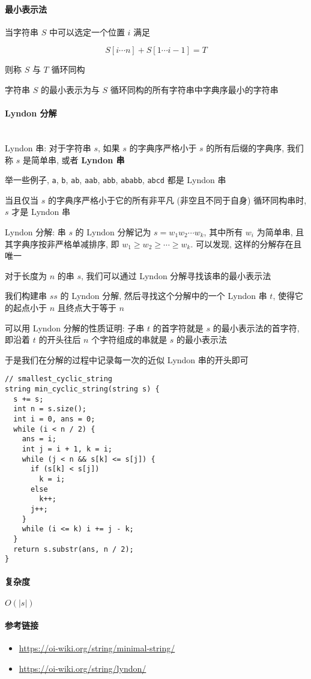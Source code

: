 \paragraph{最小表示法}

当字符串 \(S\) 中可以选定一个位置 \(i\) 满足

\[
    S[i\cdots n]+S[1\cdots i-1]=T
\]

则称 \(S\) 与 \(T\) 循环同构

字符串 \(S\) 的最小表示为与 \(S\) 循环同构的所有字符串中字典序最小的字符串

\paragraph{Lyndon 分解}~\\

Lyndon 串: 对于字符串 \(s\), 如果 \(s\) 的字典序严格小于 \(s\) 的所有后缀的字典序, 我们称 \(s\) 是简单串, 或者 \textbf{Lyndon 串}

举一些例子, \verb|a|, \verb|b|, \verb|ab|, \verb|aab|, \verb|abb|, \verb|ababb|, \verb|abcd| 都是 Lyndon 串

当且仅当 \(s\) 的字典序严格小于它的所有非平凡 (非空且不同于自身) 循环同构串时, \(s\) 才是 Lyndon 串

Lyndon 分解: 串 \(s\) 的 Lyndon 分解记为 \(s=w_1w_2\cdots w_k\), 其中所有 \(w_i\) 为简单串, 且其字典序按非严格单减排序, 即 \(w_1\ge w_2\ge\cdots\ge w_k\). 可以发现, 这样的分解存在且唯一

对于长度为 \(n\) 的串 \(s\), 我们可以通过 Lyndon 分解寻找该串的最小表示法

我们构建串 \(ss\) 的 Lyndon 分解, 然后寻找这个分解中的一个 Lyndon 串 \(t\), 使得它的起点小于 \(n\) 且终点大于等于 \(n\)

可以用 Lyndon 分解的性质证明: 子串 \(t\) 的首字符就是 \(s\) 的最小表示法的首字符, 即沿着 \(t\) 的开头往后 \(n\) 个字符组成的串就是 \(s\) 的最小表示法

于是我们在分解的过程中记录每一次的近似 Lyndon 串的开头即可

\begin{verbatim}
// smallest_cyclic_string
string min_cyclic_string(string s) {
  s += s;
  int n = s.size();
  int i = 0, ans = 0;
  while (i < n / 2) {
    ans = i;
    int j = i + 1, k = i;
    while (j < n && s[k] <= s[j]) {
      if (s[k] < s[j])
        k = i;
      else
        k++;
      j++;
    }
    while (i <= k) i += j - k;
  }
  return s.substr(ans, n / 2);
}
\end{verbatim}

\paragraph{复杂度}

\(O(|s|)\)

\paragraph{参考链接}

\begin{itemize}
    \item \url{https://oi-wiki.org/string/minimal-string/}
    \item \url{https://oi-wiki.org/string/lyndon/}
\end{itemize}
